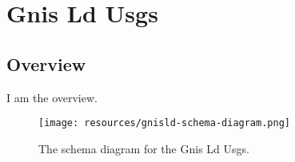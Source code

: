 
\section{Gnis Ld Usgs}
\label{sec:gnis-ld-usgs}
\subsection{Overview}
\label{ssec:overview}

I am the overview.

\begin{figure}[h!]
  \begin{center}
    \texttt{[image: resources/gnisld-schema-diagram.png]}
  \end{center}
  \caption{The schema diagram for the Gnis Ld Usgs.}
  \label{fig:ov-diagram}
\end{figure}


